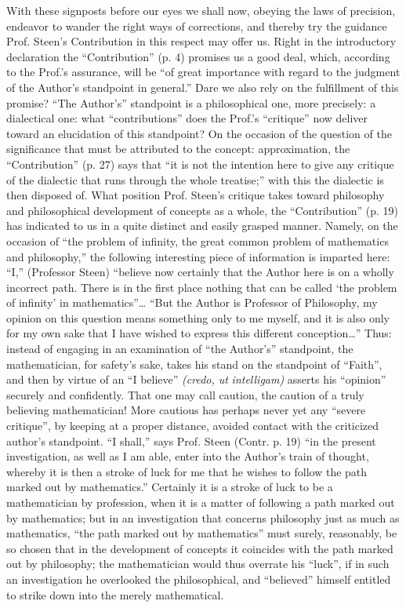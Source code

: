 \documentclass[12pt,a4paper,openany]{book}
\newcommand{\opage}[1]{\marginnote{\footnotesize\textit{[#1]}}}
\begin{document}
With these signposts before our eyes we shall now, obeying
the laws of precision, endeavor to wander the right
ways of corrections, and thereby try the guidance Prof.
Steen's Contribution in this respect may offer us. Right
in the introductory declaration the ``Contribution'' (p. 4) promises us a good deal,
which, according to the Prof.'s assurance, will be ``of great importance with regard to the judgment of the Author's
standpoint in general.'' Dare we also rely on
the fulfillment of this promise? ``The Author's'' standpoint is a
philosophical one, more precisely: a dialectical one: what ``contributions''
does the Prof.'s ``critique'' now deliver toward an elucidation of this
standpoint? On the occasion of the question of the significance that must be attributed to the concept: approximation, the
``Contribution'' (p. 27) says that ``it is not the intention here to give
any critique of the dialectic that runs through the whole treatise;'' with this the dialectic is then disposed of. What
\opage{12}\setcounter{footnote}{0}%
position Prof. Steen's critique takes toward philosophy
and philosophical development of concepts as a whole, the ``Contribution''
(p. 19) has indicated to us in a quite distinct and easily grasped
manner. Namely, on the occasion of ``the problem of infinity, the great
common problem of mathematics and philosophy,'' the following interesting piece of information is imparted here: ``I,''
(Professor Steen) ``believe now certainly that the Author here is on
a wholly incorrect path. There is in the first place nothing
that can be called `the problem of infinity' in mathematics''\dots{} ``But the Author is Professor of Philosophy, my
opinion on this question means something only to me
myself, and it is also only for my own sake that I have
wished to express this different conception\dots{}'' Thus: instead
of engaging in an examination of ``the Author's'' standpoint, the
mathematician, for safety's sake, takes his stand on the standpoint of ``Faith'',
and then by virtue of an ``I believe'' \textit{(credo, ut}
\textit{intelligam)} asserts his ``opinion'' securely and confidently. That
one may call caution, the caution of a truly believing mathematician!
More cautious has perhaps never yet any
``severe critique'', by keeping at a proper distance, avoided contact with the criticized author's standpoint.
``I shall,'' says Prof. Steen (Contr. p. 19) ``in the
present investigation, as well as I am able, enter
into the Author's train of thought, whereby it is then a stroke of luck for me
that he wishes to follow the path marked out by mathematics.''
Certainly it is a stroke of luck to be a mathematician by profession, when
it is a matter of following a path marked out by mathematics;
but in an investigation that concerns philosophy just as much
as mathematics, ``the path marked out by mathematics''
must surely, reasonably, be so chosen that in the
development of concepts it coincides with the path marked out by philosophy; the mathematician would thus overrate his
``luck'', if in such an investigation he overlooked
the philosophical, and ``believed'' himself entitled to strike down
into the merely mathematical.
\end{document}
